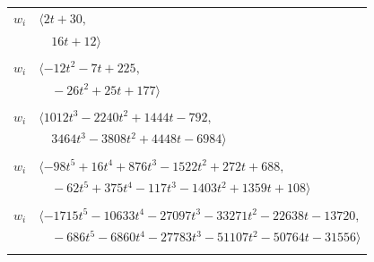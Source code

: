 \documentclass[11pt]{article}
\begin{document}
\begin{longtable}{@{}ll@{}}
$w_i$ & $\langle 2t+30,$\\
 & $\quad 16t+12\rangle$\\
\addlinespace[2pt]
\multicolumn{2}{@{}p{0.97\textwidth}@{}}{$i=46$, $D_i=1$, $\rho_{ij}$: $6{:}2, \allowbreak 23{:}2, \allowbreak 27{:}1, \allowbreak 32{:}1, \allowbreak 35{:}2, \allowbreak 39{:}1, \allowbreak 49{:}2, \allowbreak 53{:}1, \allowbreak 56{:}1$}\\
$w_i$ & $\langle -12t^{2}-7t+225,$\\
 & $\quad -26t^{2}+25t+177\rangle$\\
\addlinespace[2pt]
\multicolumn{2}{@{}p{0.97\textwidth}@{}}{$i=47$, $D_i=1$, $\rho_{ij}$: $2{:}2, \allowbreak 9{:}1, \allowbreak 12{:}1, \allowbreak 13{:}2, \allowbreak 16{:}1, \allowbreak 18{:}1, \allowbreak 19{:}2, \allowbreak 25{:}1, \allowbreak 28{:}1, \allowbreak 31{:}2, \allowbreak 33{:}2, \allowbreak 35{:}2, \allowbreak 38{:}1, \allowbreak 56{:}1, \allowbreak 60{:}2, \allowbreak 61{:}2$}\\
$w_i$ & $\langle 1012t^{3}-2240t^{2}+1444t-792,$\\
 & $\quad 3464t^{3}-3808t^{2}+4448t-6984\rangle$\\
\addlinespace[2pt]
\multicolumn{2}{@{}p{0.97\textwidth}@{}}{$i=48$, $D_i=1$, $\rho_{ij}$: $1{:}1, \allowbreak 6{:}1, \allowbreak 25{:}1, \allowbreak 29{:}2, \allowbreak 35{:}2, \allowbreak 36{:}1, \allowbreak 38{:}1, \allowbreak 42{:}2, \allowbreak 51{:}2, \allowbreak 56{:}2, \allowbreak 58{:}1$}\\
$w_i$ & $\langle -98t^{5}+16t^{4}+876t^{3}-1522t^{2}+272t+688,$\\
 & $\quad -62t^{5}+375t^{4}-117t^{3}-1403t^{2}+1359t+108\rangle$\\
\addlinespace[2pt]
\multicolumn{2}{@{}p{0.97\textwidth}@{}}{$i=49$, $D_i=343$, $\rho_{ij}$: $4{:}2, \allowbreak 8{:}1, \allowbreak 19{:}2, \allowbreak 23{:}1, \allowbreak 27{:}2, \allowbreak 29{:}1, \allowbreak 36{:}2, \allowbreak 46{:}1, \allowbreak 54{:}1$}\\
$w_i$ & $\langle -1715t^{5}-10633t^{4}-27097t^{3}-33271t^{2}-22638t-13720,$\\
 & $\quad -686t^{5}-6860t^{4}-27783t^{3}-51107t^{2}-50764t-31556\rangle$\\
\addlinespace[2pt]
\multicolumn{2}{@{}p{0.97\textwidth}@{}}{$i=50$, $D_i=16983563041$, $\rho_{ij}$: $4{:}1, \allowbreak 7{:}2, \allowbreak 12{:}2, \allowbreak 14{:}1, \allowbreak 17{:}2, \allowbreak 19{:}1, \allowbreak 33{:}1, \allowbreak 53{:}1, \allowbreak 59{:}1, \allowbreak 64{:}2, \allowbreak 65{:}2, \allowbreak 68{:}1, \allowbreak 76{:}1, \allowbreak 77{:}2, \allowbreak 78{:}1, \allowbreak 82{:}2, \allowbreak 90{:}2, \allowbreak 93{:}2, \allowbreak 96{:}2$}\\

\end{longtable}
\end{document}
